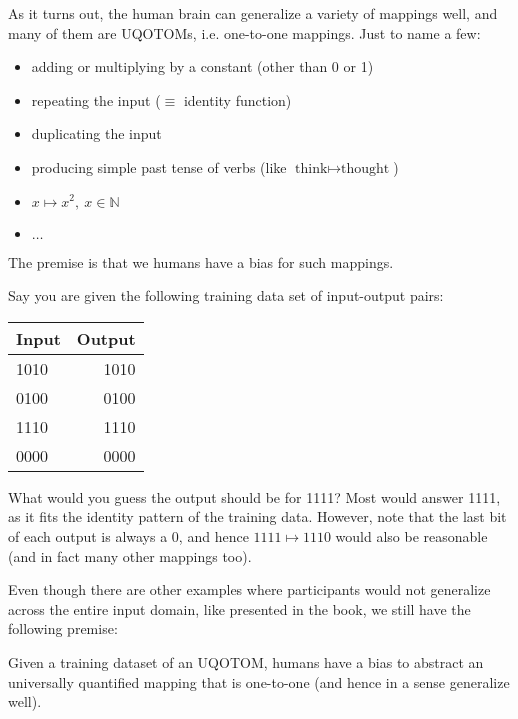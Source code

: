 \documentclass[../../main.tex]{subfiles}
\begin{document}
    As it turns out, the human brain can generalize a variety of mappings well, and many of them are UQOTOMs, i.e. one-to-one mappings. Just to name a few:
    \begin{itemize}
        \item adding or multiplying by a constant (other than 0 or 1)
        \item repeating the input ($\equiv$ identity function)
        \item duplicating the input
        \item producing simple past tense of verbs (like $\text{think} \mapsto \text{thought}$)
        \item $x \mapsto x^2, \ x \in \mathbb{N}$
        \item $\dots$
    \end{itemize}

    The premise is that we humans have a bias for such mappings.

    \begin{example}
        \label{example:uqotom_bias}
        Say you are given the following training data set of input-output pairs:
        \begin{center}
            \begin{tabular}{l|r}
                Input & Output \\
                \hline
                1010 & 1010 \\
                0100 & 0100 \\
                1110 & 1110 \\
                0000 & 0000 \\
            \end{tabular}
        \end{center}

        What would you guess the output should be for 1111? Most would answer 1111, as it fits the identity pattern of the training data. However, note that the last bit of each output is always a 0, and hence $1111 \mapsto 1110$ would also be reasonable (and in fact many other mappings too).
    \end{example}

    Even though there are other examples where participants would not generalize across the entire input domain, like presented in the book, we still have the following premise:

    \begin{premise}
        Given a training dataset of an UQOTOM, humans have a bias to abstract an universally quantified mapping that is one-to-one (and hence in a sense generalize well).
    \end{premise}
\end{document}
